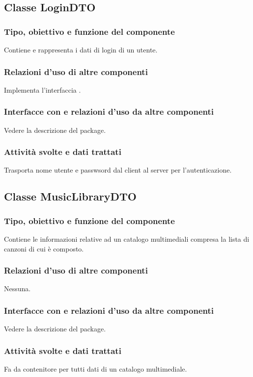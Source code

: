 \subsection{Classe LoginDTO}
\subsubsection*{Tipo, obiettivo e funzione del componente}
Contiene e rappresenta i dati di login di un utente.
\subsubsection*{Relazioni d'uso di altre componenti}
Implementa l'interfaccia .
\subsubsection*{Interfacce con e relazioni d'uso da altre componenti}
Vedere la descrizione del package.
\subsubsection*{Attivit\`a svolte e dati trattati}
Trasporta nome utente e passwsord dal client al server per l'autenticazione.

\subsection{Classe MusicLibraryDTO}
\subsubsection*{Tipo, obiettivo e funzione del componente}
Contiene le informazioni relative ad un catalogo multimediali compresa la lista
di canzoni di cui \`e composto. 
\subsubsection*{Relazioni d'uso di altre componenti} 
Nessuna.
\subsubsection*{Interfacce con e relazioni d'uso da altre componenti}
Vedere la descrizione del package.
\subsubsection*{Attivit\`a svolte e dati trattati}
Fa da contenitore per tutti dati di un catalogo multimediale.

